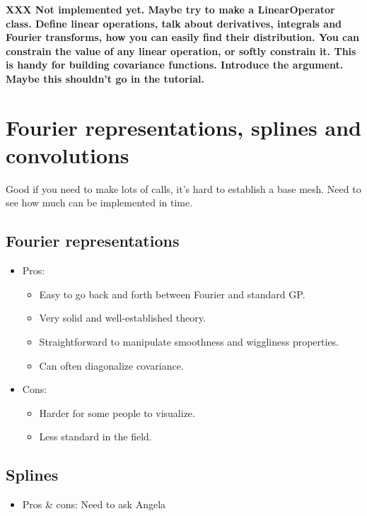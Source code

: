 \documentclass{manual}
\begin{document}
\textbf{XXX Not implemented yet. Maybe try to make a LinearOperator class. Define linear operations, talk about derivatives, integrals and Fourier transforms, how you can easily find their distribution. You can constrain the value of any linear operation, or softly constrain it. This is handy for building covariance functions. Introduce the  argument. Maybe this shouldn't go in the tutorial.}


\section{Fourier representations, splines and convolutions}\label{sec:approx} %
Good if you need to make lots of calls, it's hard to establish a base mesh. Need to see how much can be implemented in time.

\subsection{Fourier representations}\label{sub:fourier}
\begin{itemize}
	\item Pros:
	\begin{itemize}
		\item Easy to go back and forth between Fourier and standard GP.
		\item Very solid and well-established theory.
		\item Straightforward to manipulate smoothness and wiggliness properties.
		\item Can often diagonalize covariance.
	\end{itemize}
	\item Cons:
	\begin{itemize}
		\item Harder for some people to visualize.
		\item Less standard in the field.
	\end{itemize}
\end{itemize}

\subsection{Splines}\label{sub:splines}
\begin{itemize}
	\item Pros \& cons: Need to ask Angela
\end{itemize}
\end{document}
